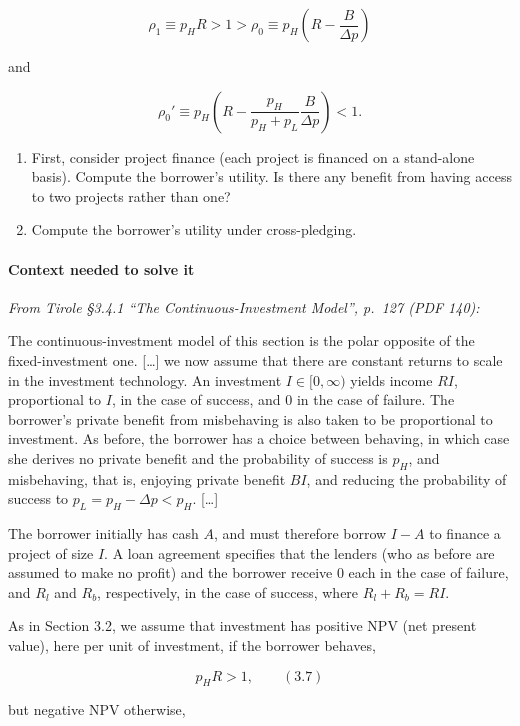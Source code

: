 \documentclass[11pt,a4paper]{article}
\begin{document}
\[\rho_1 \equiv p_H R > 1 > \rho_0 \equiv p_H\left(R - \frac{B}{\Delta p}\right)\]

and

\[\rho_0' \equiv p_H\left(R - \frac{p_H}{p_H + p_L}\frac{B}{\Delta p}\right) < 1.\]

\begin{enumerate}
\def\labelenumi{(\roman{enumi})}
\item
  First, consider project finance (each project is financed on a stand-alone basis). Compute the
  borrower's utility. Is there any benefit from having access to two projects rather than one?
\item
  Compute the borrower's utility under cross-pledging.
\end{enumerate}

\paragraph{Context needed to solve it}

\emph{From Tirole §3.4.1 ``The Continuous-Investment Model'', p.~127 (PDF 140):}

The continuous-investment model of this section is the polar opposite of the fixed-investment one.
{[}\ldots{]} we now assume that there are constant returns to scale in the investment technology. An
investment \(I \in [0, \infty)\) yields income \(RI\), proportional to \(I\), in the case of
success, and 0 in the case of failure. The borrower's private benefit from misbehaving is also taken
to be proportional to investment. As before, the borrower has a choice between behaving, in which
case she derives no private benefit and the probability of success is \(p_H\), and misbehaving, that
is, enjoying private benefit \(BI\), and reducing the probability of success to
\(p_L = p_H - \Delta p < p_H\). {[}\ldots{]}

The borrower initially has cash \(A\), and must therefore borrow \(I - A\) to finance a project of
size \(I\). A loan agreement specifies that the lenders (who as before are assumed to make no
profit) and the borrower receive 0 each in the case of failure, and \(R_l\) and \(R_b\),
respectively, in the case of success, where \(R_l + R_b = RI\).

As in Section 3.2, we assume that investment has positive NPV (net present value), here per unit of
investment, if the borrower behaves,

\[p_H R > 1, \qquad (3.7)\]

but negative NPV otherwise,
\end{document}
